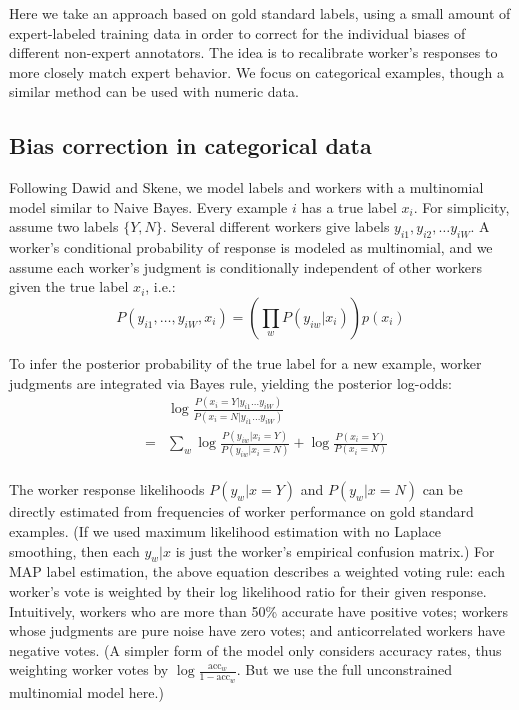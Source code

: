 \documentclass[11pt]{article}
\begin{document}

Here we take an approach based on gold standard labels, using a small amount of expert-labeled training data in order to correct for the individual biases of different non-expert annotators.  The idea is to recalibrate worker's responses to more closely match expert behavior.  We focus on categorical examples, though a similar method can be used with numeric data.
\vspace*{-0.1in}
\subsection{ Bias correction in categorical data }

Following Dawid and Skene, we model labels and workers with a multinomial model similar to Naive Bayes.
Every example $i$ has a true label $x_i$.  For simplicity, assume two labels $\{Y,N\}$.   Several different workers give labels $y_{i1}, y_{i2}, \ldots y_{iW}$.  A worker's conditional probability of response is modeled as multinomial, and we assume each worker's judgment is conditionally independent of other workers given the true label $x_i$, i.e.:
\[ P(y_{i1}, \ldots, y_{iW}, x_i) = \left( \prod_{w} P(y_{iw} | x_i) \right) p(x_i) \]

To infer the posterior probability of the true label for a new example, worker judgments are integrated via Bayes rule, yielding the posterior log-odds:
\begin{eqnarray*}
&& \log \frac{P(x_i = Y  | y_{i1} \ldots y_{iW}) }{ P(x_i=N | y_{i1} \ldots y_{iW})  }  \\
&=& \sum_w \log \frac{ P(y_{iw} | x_i = Y) }{ P(y_{iw} | x_i = N) } + \log \frac{P(x_i=Y)}{P(x_i=N)} \\
\end{eqnarray*}

The worker response likelihoods $P(y_w | x=Y)$ and $P(y_w | x=N)$ can be directly estimated from frequencies of worker performance on gold standard examples.  
(If we used maximum likelihood estimation with no Laplace smoothing, then each $y_w | x$ is just the worker's empirical confusion matrix.)  For MAP label estimation, the above equation describes a weighted voting rule: each worker's vote is weighted by their log likelihood ratio for their given response.  Intuitively, workers who are more than 50\% accurate have positive votes; workers whose judgments are pure noise have zero votes; and anticorrelated workers have negative votes.  (A simpler form of the model only considers accuracy rates, thus weighting worker votes by $\log \frac{\textrm{acc}_w}{1-\textrm{acc}_w}$.  But we use the full unconstrained multinomial model here.)
\end{document}
